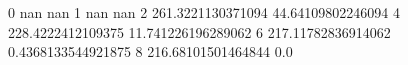 0 nan nan
1 nan nan
2 261.3221130371094 44.64109802246094
4 228.4222412109375 11.741226196289062
6 217.11782836914062 0.4368133544921875
8 216.68101501464844 0.0
